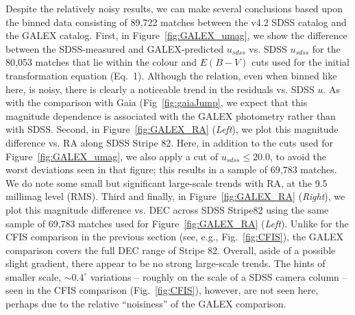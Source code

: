 \documentclass[fleqn,usenatbib]{mnras}
\begin{document}
Despite the relatively noisy results, we can make several conclusions
based upon the binned data consisting of 89,722 matches between the
v4.2 SDSS catalog and the GALEX catalog.  First, in
Figure~\ref{fig:GALEX_umag}, we show the difference between the
SDSS-measured and GALEX-predicted $u_{sdss}$ vs. SDSS $u_{sdss}$ for
the 80,053 matches that lie within the colour and $E(B-V)$ cuts used
for the initial transformation equation (Eq.~1).  Although the
relation, even when binned like here, is noisy, there is clearly a
noticeable trend in the residuals vs. SDSS $u$.  As with the
comparison with Gaia (Fig~\ref{fig:gaiaJump}, we expect that this
magnitude dependence is associated with the GALEX photometry rather
than with SDSS.  Second, in Figure~\ref{fig:GALEX_RA} ({\it Left}), we plot this
magnitude difference vs. RA along SDSS Stripe 82.  Here, in addition
to the cuts used for Figure~\ref{fig:GALEX_umag}, we also apply a cut
of $u_{sdss}\le20.0$, to avoid the worst deviations seen in that
figure; this results in a sample of 69,783 matches.  We do note some
small but significant large-scale trends with RA, at the 9.5 millimag
level (RMS).  
Third and finally, in Figure~\ref{fig:GALEX_RA} ({\it Right}), we plot this
magnitude difference vs. DEC across SDSS Stripe82 using the same
sample of 69,783 matches used for Figure~\ref{fig:GALEX_RA} ({\it Left}).  Unlike
for the CFIS comparison in the previous section (see, e.g.,
Fig.~\ref{fig:CFIS}), the GALEX comparison covers the full DEC range of
Stripe 82.  Overall, aside of a possible slight gradient, there appear
to be no strong large-scale trends.  The hints of smaller scale, $\sim0.4^{\circ}$ variations -- roughly on the scale of a SDSS
camera column -- seen in the CFIS comparison (Fig.~\ref{fig:CFIS}),
however, are not seen here, perhaps due to the relative ``noisiness''
of the GALEX comparison.
\end{document}
